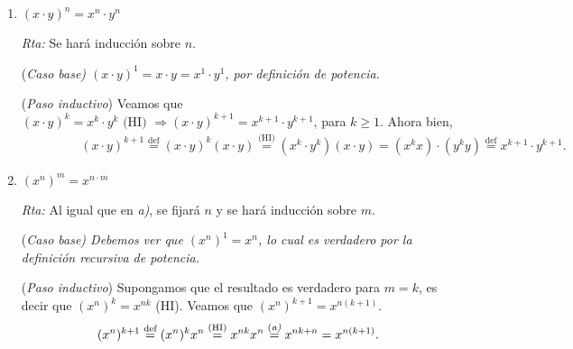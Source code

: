 \documentclass[a4paper,12pt,twoside,spanish,reqno]{amsbook}
\numberwithin{equation}{section}
\newcommand{\rta}{\noindent\textit{Rta: }}
\begin{document}
\begin{enumerate}
\begin{enumerate}
                \rta Se fijará $n$ y se hará inducción sobre $m$. 
                
                \noindent(\it Caso  base\rm) Debemos ver que $x^{n}x^1 = x^{n+1}$, lo cual es verdadero por la definición recursiva de potencia. 
                
                \noindent ({\it Paso  inductivo}) Supongamos que el resultado es verdadero para $m=k$, es decir que $x^{n}x^k = a^{n+k}$ (HI). Veamos que  $x^{n}x^{k+1} = x^{n+k+1}$. Ahora bien, 
                \begin{alignat*}2
                x^{n}x^{k+1} &= x^{n}x^{k}x&  & \text{(definición de potencia)} \\
                &= x^{n+k}x& & \text{(HI)} \\
                &= x^{n+k+1}&  & \text{(definición de potencia)}. 
                \end{alignat*}
                \item $(x\cdot y)^n=x^n\cdot y^n$
                
                \rta Se  hará inducción sobre $n$.
                
                \noindent(\it Caso  base\rm) $(x\cdot y)^1=x\cdot y = x^1\cdot y^1$, por definición de potencia. 
                
                \noindent ({\it Paso  inductivo}) Veamos que  $(x\cdot y)^k=x^k\cdot y^k \text{ (HI) } \Rightarrow (x\cdot y)^{k+1}=x^{k+1}\cdot y^{k+1}$, para $k \ge 1$. Ahora bien,
                \begin{multline*}
                \qquad\; \qquad (x\cdot y)^{k+1} \overset{\text{def}}{=} (x\cdot y)^{k} (x\cdot y) \overset{\text{(HI)}}{=} (x^{k}\cdot y^{k}) (x\cdot y) = (x^{k}x)\cdot (y^{k}y) \overset{\text{def}}{=}  x^{k+1}\cdot y^{k+1}.
                \end{multline*}
                
                \item $(x^n)^m = x^{n\cdot m}$
                
                \rta Al igual que en \textit{a)}, se fijará $n$ y se hará inducción sobre $m$.
                
                \noindent(\it Caso  base\rm) Debemos ver que $(x^n)^1 = x^n$, lo cual es verdadero por la definición recursiva de potencia. 
                
                \noindent ({\it Paso  inductivo}) Supongamos que el resultado es verdadero para $m=k$, es decir que  $(x^n)^k = x^{nk}$ (HI). Veamos que  $(x^n)^{k+1} = x^{n(k+1)}$. 
                \begin{equation*}
                (x^n)^{k+1}  \overset{\text{def}}{=} (x^n)^{k}x^n
                \overset{\text{(HI)}}{=} x^{nk}x^n
                \overset{\text{(\textit{a)}}}{=} x^{nk+n} 
                = x^{n(k+1)}.  
                \end{equation*} 
            \end{enumerate}
        


\end{enumerate}
\end{document}
